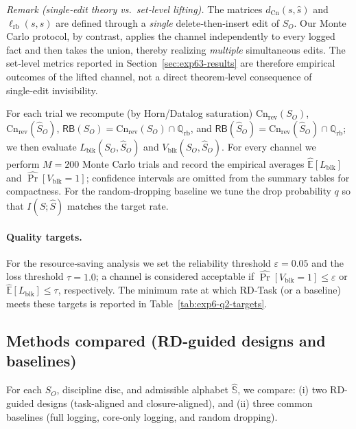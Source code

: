 \documentclass[twoside]{article}
\newcommand{\Cn}{\mathrm{Cn}}
\newcommand{\1}{\mathbf{1}}
\begin{document}
\emph{Remark (single‑edit theory vs.\ set‑level lifting).}
The matrices \(d_{\Cn}(s,\hat s)\) and \(\ell_{\mathrm{rb}}(s,\hat s)\) are
defined through a \emph{single} delete‑then‑insert edit of \(S_O\).
Our Monte Carlo protocol, by contrast, applies the channel independently to
every logged fact and then takes the union, thereby realizing
\emph{multiple} simultaneous edits.
The set‑level metrics reported in Section~\ref{sec:exp63-results} are
therefore empirical outcomes of the lifted channel, not a direct theorem‑level
consequence of single‑edit invisibility.

For each trial we recompute (by Horn/Datalog saturation)
\(\Cn_{\mathrm{rev}}(S_O)\), \(\Cn_{\mathrm{rev}}(\hat S_O)\),
\(\mathsf{RB}(S_O)=\Cn_{\mathrm{rev}}(S_O)\cap\mathbb Q_{\mathrm{rb}}\), and
\(\mathsf{RB}(\hat S_O)=\Cn_{\mathrm{rev}}(\hat S_O)\cap\mathbb Q_{\mathrm{rb}}\);
we then evaluate \(L_{\mathrm{blk}}(S_O,\hat S_O)\) and
\(V_{\mathrm{blk}}(S_O,\hat S_O)\).
For every channel we perform \(M=200\) Monte Carlo trials and record the
empirical averages \(\widehat{\mathbb E}[L_{\mathrm{blk}}]\) and
\(\widehat{\Pr}[V_{\mathrm{blk}}=1]\);
confidence intervals are omitted from the summary tables for compactness.
For the random‑dropping baseline we tune the drop probability \(q\) so that
\(I(S;\hat S)\) matches the target rate.

\paragraph{Quality targets.}
For the resource‑saving analysis we set the reliability threshold
\(\varepsilon = 0.05\) and the loss threshold \(\tau = 1.0\); a channel is
considered acceptable if \(\widehat{\Pr}[V_{\mathrm{blk}}=1]\le\varepsilon\) or
\(\widehat{\mathbb E}[L_{\mathrm{blk}}]\le\tau\), respectively.
The minimum rate at which RD‑Task (or a baseline) meets these targets is
reported in Table~\ref{tab:exp6-q2-targets}.

\subsection{Methods compared (RD-guided designs and baselines)}
\label{sec:methods-compared}

For each \(S_O\), discipline \(\mathrm{disc}\), and admissible alphabet \(\hat{\mathbb S}\), we compare:
(i) two RD-guided designs (task-aligned and closure-aligned), and
(ii) three common baselines (full logging, core-only logging, and random dropping).
\end{document}
